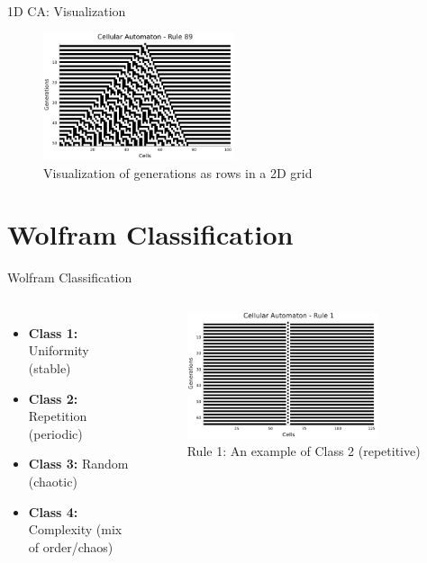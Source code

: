 \begin{frame}{1D CA: Visualization}
    \begin{figure}
        \centering
        \includegraphics[width=0.5\textwidth]{../paper/figures/carule89}
        \caption{Visualization of generations as rows in a 2D grid}

    \end{figure}

\end{frame}


\section{Wolfram Classification}
\begin{frame}{Wolfram Classification}
    \begin{columns}
        \begin{itemize}
            \item \textbf{Class 1:} Uniformity (stable)
            \item \textbf{Class 2:} Repetition (periodic)
            \item \textbf{Class 3:} Random (chaotic)
            \item \textbf{Class 4:} Complexity (mix of order/chaos)
        \end{itemize}
        \begin{figure}
            \centering
            \includegraphics[width=0.8\textwidth]{../paper/figures/rule1.png}
            \caption{Rule 1: An example of Class 2 (repetitive)}
        \end{figure}
    \end{columns}
\end{frame}


